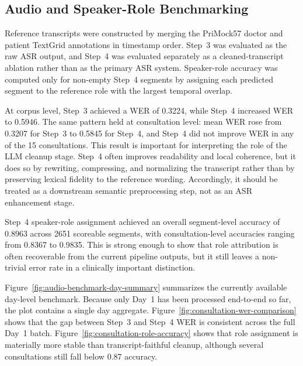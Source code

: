 \subsection{Audio and Speaker-Role Benchmarking}

Reference transcripts were constructed by merging the PriMock57 doctor and patient TextGrid annotations in timestamp order. Step~3 was evaluated as the raw ASR output, and Step~4 was evaluated separately as a cleaned-transcript ablation rather than as the primary ASR system. Speaker-role accuracy was computed only for non-empty Step~4 segments by assigning each predicted segment to the reference role with the largest temporal overlap.



At corpus level, Step~3 achieved a WER of 0.3224, while Step~4 increased WER to 0.5946. The same pattern held at consultation level: mean WER rose from 0.3207 for Step~3 to 0.5845 for Step~4, and Step~4 did not improve WER in any of the 15 consultations. This result is important for interpreting the role of the LLM cleanup stage. Step~4 often improves readability and local coherence, but it does so by rewriting, compressing, and normalizing the transcript rather than by preserving lexical fidelity to the reference wording. Accordingly, it should be treated as a downstream semantic preprocessing step, not as an ASR enhancement stage.

Step~4 speaker-role assignment achieved an overall segment-level accuracy of 0.8963 across 2651 scoreable segments, with consultation-level accuracies ranging from 0.8367 to 0.9835. This is strong enough to show that role attribution is often recoverable from the current pipeline outputs, but it still leaves a non-trivial error rate in a clinically important distinction.





Figure~\ref{fig:audio-benchmark-day-summary} summarizes the currently available day-level benchmark. Because only Day~1 has been processed end-to-end so far, the plot contains a single day aggregate. Figure~\ref{fig:consultation-wer-comparison} shows that the gap between Step~3 and Step~4 WER is consistent across the full Day~1 batch. Figure~\ref{fig:consultation-role-accuracy} shows that role assignment is materially more stable than transcript-faithful cleanup, although several consultations still fall below 0.87 accuracy.


